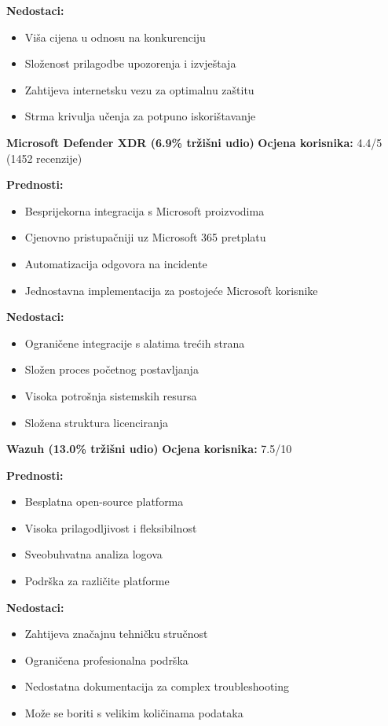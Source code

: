 \textbf{Nedostaci:}
\begin{itemize}
\item Viša cijena u odnosu na konkurenciju
\item Složenost prilagodbe upozorenja i izvještaja
\item Zahtijeva internetsku vezu za optimalnu zaštitu
\item Strma krivulja učenja za potpuno iskorištavanje
\end{itemize}

\textbf{Microsoft Defender XDR (6.9\% tržišni udio)}
\textbf{Ocjena korisnika:} 4.4/5 (1452 recenzije)

\textbf{Prednosti:}
\begin{itemize}
\item Besprijekorna integracija s Microsoft proizvodima
\item Cjenovno pristupačniji uz Microsoft 365 pretplatu
\item Automatizacija odgovora na incidente
\item Jednostavna implementacija za postojeće Microsoft korisnike
\end{itemize}

\textbf{Nedostaci:}
\begin{itemize}
\item Ograničene integracije s alatima trećih strana
\item Složen proces početnog postavljanja
\item Visoka potrošnja sistemskih resursa
\item Složena struktura licenciranja
\end{itemize}

\textbf{Wazuh (13.0\% tržišni udio)}
\textbf{Ocjena korisnika:} 7.5/10

\textbf{Prednosti:}
\begin{itemize}
\item Besplatna open-source platforma
\item Visoka prilagodljivost i fleksibilnost
\item Sveobuhvatna analiza logova
\item Podrška za različite platforme
\end{itemize}

\textbf{Nedostaci:}
\begin{itemize}
\item Zahtijeva značajnu tehničku stručnost
\item Ograničena profesionalna podrška
\item Nedostatna dokumentacija za complex troubleshooting
\item Može se boriti s velikim količinama podataka
\end{itemize}

